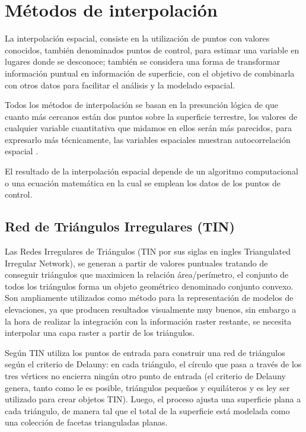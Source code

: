 \section{Métodos de interpolación}
\label{sec:cap2-metodos-interpolacion}

La interpolación espacial, consiste en la utilización de puntos con valores conocidos, también denominados puntos
de control, para estimar una variable en lugares donde se desconoce; también se considera una forma de transformar
información puntual en información de superficie, con el objetivo de combinarla con otros datos para facilitar el
análisis y la modelado espacial.

Todos los métodos de interpolación se basan en la presunción lógica de que cuanto más cercanos están dos puntos
sobre la superficie terrestre, los valores de cualquier variable cuantitativa que midamos en ellos serán más
parecidos, para expresarlo más técnicamente, las variables espaciales muestran autocorrelación espacial \cite{fAlonsoSig2006}.

El resultado de la interpolación espacial depende de un algoritmo computacional o una ecuación matemática en la
cual se emplean los datos de los puntos de control\cite{NINO2011}.


\subsection {Red de Triángulos Irregulares (TIN)}
Las Redes Irregulares de Triángulos (TIN por sus siglas en ingles Triangulated Irregular Network), se generan a
partir de valores puntuales tratando de conseguir triángulos que maximicen la relación área/perímetro, el conjunto
de todos los triángulos forma un objeto geométrico denominado conjunto convexo\cite{fAlonsoSig2006}. Son
ampliamente utilizados como método para la representación de modelos de elevaciones, ya que producen resultados
visualmente muy buenos, sin embargo a la hora de realizar la integración con la información raster restante, se
necesita interpolar una capa raster a partir de los triángulos.

Según \cite{cPachecoMDE2003} TIN utiliza los puntos de entrada para construir una red de triángulos según el
criterio de Delauny: en cada triángulo, el círculo que pasa a través de los tres vértices no encierra ningún otro
punto de entrada (el criterio de Delauny genera, tanto como le es posible, triángulos pequeños y equiláteros y es
ley ser utilizado para crear objetos TIN). Luego, el proceso ajusta una superficie plana a cada triángulo, de
manera tal que el total de la superficie está modelada como una colección de facetas trianguladas planas.

